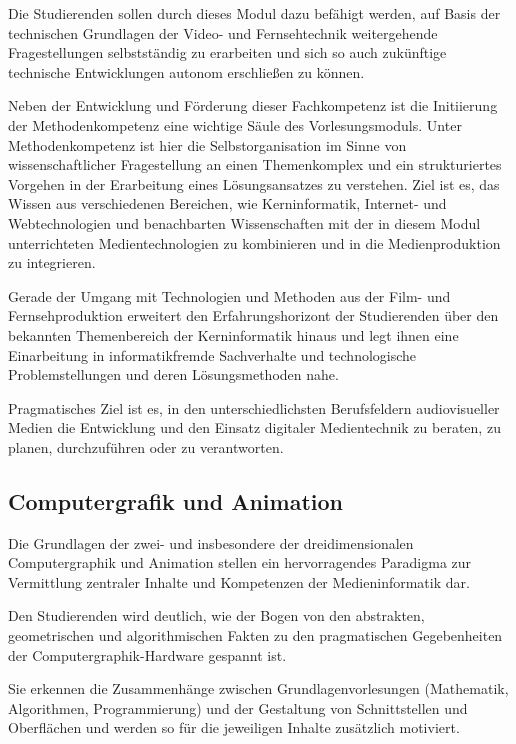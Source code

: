 Die Studierenden sollen durch dieses Modul dazu befähigt werden, auf
Basis der technischen Grundlagen der Video- und Fernsehtechnik
weitergehende Fragestellungen selbstständig zu erarbeiten und sich so
auch zukünftige technische Entwicklungen autonom erschließen zu können.

Neben der Entwicklung und Förderung dieser Fachkompetenz ist die
Initiierung der Methodenkompetenz eine wichtige Säule des
Vorlesungsmoduls. Unter Methodenkompetenz ist hier die
Selbstorganisation im Sinne von wissenschaftlicher Fragestellung an
einen Themenkomplex und ein strukturiertes Vorgehen in der Erarbeitung
eines Lösungsansatzes zu verstehen. Ziel ist es, das Wissen aus
verschiedenen Bereichen, wie Kerninformatik, Internet- und
Webtechnologien und benachbarten Wissenschaften mit der in diesem Modul
unterrichteten Medientechnologien zu kombinieren und in die
Medienproduktion zu integrieren.

Gerade der Umgang mit Technologien und Methoden aus der Film- und
Fernsehproduktion erweitert den Erfahrungshorizont der Studierenden über
den bekannten Themenbereich der Kerninformatik hinaus und legt ihnen
eine Einarbeitung in informatikfremde Sachverhalte und technologische
Problemstellungen und deren Lösungsmethoden nahe.

Pragmatisches Ziel ist es, in den unterschiedlichsten Berufsfeldern
audiovisueller Medien die Entwicklung und den Einsatz digitaler
Medientechnik zu beraten, zu planen, durchzuführen oder zu verantworten.

\subsection*{Computergrafik und
Animation\label{/mi-2017/modulbeschreibungen-bachelor/BA_Vertiefung-Visual-Computing}}\label{computergrafik-und-animationpathlabelmi-2017modulbeschreibungen-bachelorbaux5fvertiefung-visual-computing-1}

Die Grundlagen der zwei- und insbesondere der dreidimensionalen
Computergraphik und Animation stellen ein hervorragendes Paradigma zur
Vermittlung zentraler Inhalte und Kompetenzen der Medieninformatik dar.

Den Studierenden wird deutlich, wie der Bogen von den abstrakten,
geometrischen und algorithmischen Fakten zu den pragmatischen
Gegebenheiten der Computergraphik-Hardware gespannt ist.

Sie erkennen die Zusammenhänge zwischen Grundlagenvorlesungen
(Mathematik, Algorithmen, Programmierung) und der Gestaltung von
Schnittstellen und Oberflächen und werden so für die jeweiligen Inhalte
zusätzlich motiviert.

